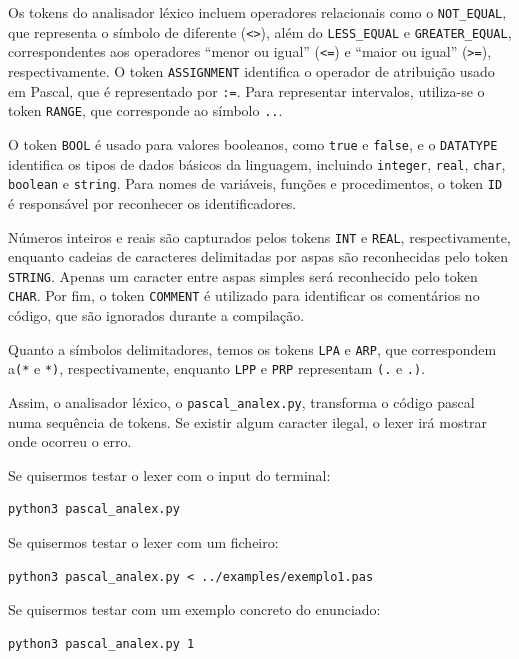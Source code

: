 \documentclass[12pt,a4paper]{report}
\begin{document}
Os tokens do analisador léxico incluem operadores relacionais como o \texttt{NOT\_EQUAL}, que representa o símbolo de diferente (\texttt{<>}), além do \texttt{LESS\_EQUAL} e \texttt{GREATER\_EQUAL}, correspondentes aos operadores “menor ou igual” (\texttt{<=}) e “maior ou igual” (\texttt{>=}), respectivamente. O token \texttt{ASSIGNMENT} identifica o operador de atribuição usado em Pascal, que é representado por \texttt{:=}. Para representar intervalos, utiliza-se o token \texttt{RANGE}, que corresponde ao símbolo \texttt{..}.

O token \texttt{BOOL} é usado para valores booleanos, como \texttt{true} e \texttt{false}, e o \texttt{DATATYPE} identifica os tipos de dados básicos da linguagem, incluindo \texttt{integer}, \texttt{real}, \texttt{char}, \texttt{boolean} e \texttt{string}. Para nomes de variáveis, funções e procedimentos, o token \texttt{ID} é responsável por reconhecer os identificadores.

Números inteiros e reais são capturados pelos tokens \texttt{INT} e \texttt{REAL}, respectivamente, enquanto cadeias de caracteres delimitadas por aspas são reconhecidas pelo token \texttt{STRING}. Apenas um caracter entre aspas simples será reconhecido pelo token \texttt{CHAR}. Por fim, o token \texttt{COMMENT} é utilizado para identificar os comentários no código, que são ignorados durante a compilação.

Quanto a símbolos delimitadores, temos os tokens \texttt{LPA} e \texttt{ARP}, que correspondem a\texttt{(*} e \texttt{*)}, respectivamente, enquanto \texttt{LPP} e \texttt{PRP} representam \texttt{(.} e \texttt{.)}.

Assim, o analisador léxico, o \texttt{pascal\_analex.py}, transforma o código pascal numa sequência de tokens. Se existir algum caracter ilegal, o lexer irá mostrar onde ocorreu o erro.

\vspace{1em}

Se quisermos testar o lexer com o input do terminal:
\begin{verbatim}
python3 pascal_analex.py
\end{verbatim}

Se quisermos testar o lexer com um ficheiro:
\begin{verbatim}
python3 pascal_analex.py < ../examples/exemplo1.pas
\end{verbatim}

Se quisermos testar com um exemplo concreto do enunciado:
\begin{verbatim}
python3 pascal_analex.py 1
\end{verbatim}
\end{document}
